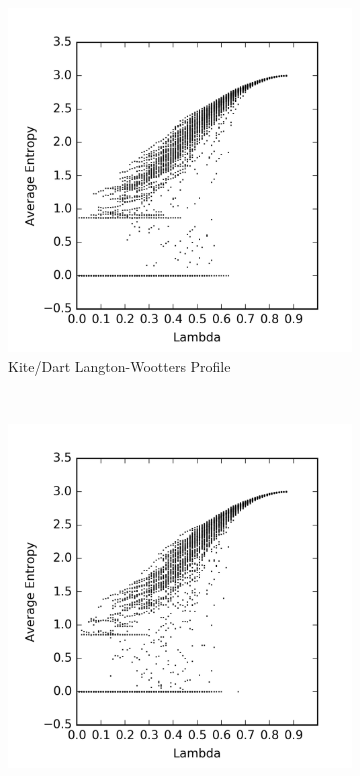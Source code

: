 \documentclass[a4paper,11pt]{report}
\begin{document}
\begin{figure}[htp]
\centering
\begin{subfigure}[t]{0.6\textwidth}
  \includegraphics[width=\textwidth]{ch6_figs/ckd_entropy_scatter}
  \caption{Kite/Dart Langton-Wootters Profile}
  \label{fig:ckd_lw_profile}
\end{subfigure}
~
\begin{subfigure}[t]{0.6\textwidth}
  \centering
  \includegraphics[width=\textwidth]{ch6_figs/crh_entropy_scatter}

\end{subfigure}
\end{figure}
\end{document}
